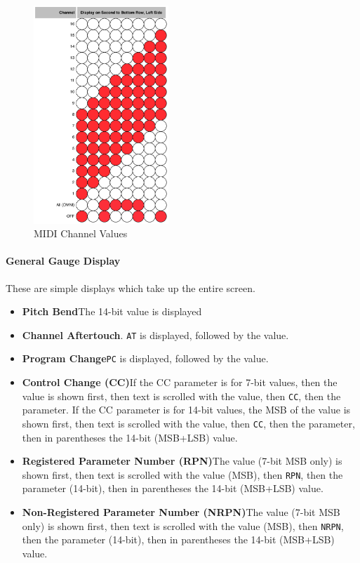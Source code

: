 \documentclass{article}
\begin{document}
\begin{figure}
\vspace{-2em}\includegraphics[width=2in]{midichannel.pdf}
\vspace{-2em}\caption{\small MIDI Channel Values}\vspace{-5em}
\label{midichannelvalues}
\end{figure}


\paragraph{General Gauge Display}  These are simple displays which take up the entire screen.

\begin{itemize}
\item {\bf Pitch Bend}\quad The 14-bit value is displayed
\item {\bf Channel Aftertouch}.  \texttt{AT} is displayed, followed by the value.
\item {\bf Program Change}\quad \texttt{PC} is displayed, followed by the value.
\item {\bf Control Change (CC)}\quad If the CC parameter is for 7-bit values, then the value is shown first, then text is scrolled with the value, then \texttt{CC}, then the parameter.  If the CC parameter is for 14-bit values, the MSB of the value is shown first, then text is scrolled with the value, then \texttt{CC}, then the parameter, then in parentheses the 14-bit (MSB+LSB) value.
\item {\bf Registered Parameter Number (RPN)}\quad The value (7-bit MSB only) is shown first, then text is scrolled with the value (MSB), then \texttt{RPN}, then the parameter (14-bit), then in parentheses the 14-bit (MSB+LSB) value.
\item {\bf Non-Registered Parameter Number (NRPN)}\quad The value (7-bit MSB only) is shown first, then text is scrolled with the value (MSB), then \texttt{NRPN}, then the parameter (14-bit), then in parentheses the 14-bit (MSB+LSB) value.
\end{itemize}
\end{document}
